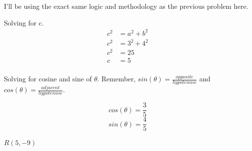 \documentclass[10pt,letterpaper]{amspset}
\begin{document}
\begin{solution}[Solution]
I'll be using the exact same logic and methodology as the previous problem here.
\bigskip


\bigskip

Solving for c.
\begin{align}
    c^2 &= a^2 + b^2 \\
    c^2 &= 3^2 + 4^2 \\
    c^2 &= 25 \\
    c &= 5 \\
\end{align}

Solving for cosine and sine of $\theta$. Remember, $sin(\theta) = \frac{opposite}{hypotenuse}$ and $cos(\theta) = \frac{adjacent}{hypotenuse}$.

\[\boxed{cos(\theta) = \frac{3}{5}}\]
\[\boxed{sin(\theta) = \frac{4}{5}}\]
\end{solution}


\pagebreak


\begin{problem}[67.]
$R(5, -9)$
\end{problem}
\end{document}
